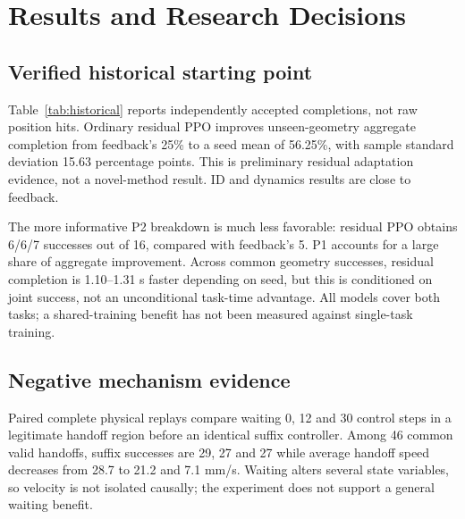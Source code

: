 \section{Results and Research Decisions}
\subsection{Verified historical starting point}
Table~\ref{tab:historical} reports independently accepted completions, not raw position hits. Ordinary residual PPO improves unseen-geometry aggregate completion from feedback's 25\% to a seed mean of 56.25\%, with sample standard deviation 15.63 percentage points. This is preliminary residual adaptation evidence, not a novel-method result. ID and dynamics results are close to feedback.

\begin{table}[t]\centering\small
\caption{Historical v6 independently accepted success generated from audited case records. Each split has 32 matched cases, comprising 16 P1 and 16 P2 cases; triples are seeds 31/41/51, not independent case replications. P1 cannot substitute for P2 evidence. These are not new pilot results.}\label{tab:historical}

\end{table}

The more informative P2 breakdown is much less favorable: residual PPO obtains 6/6/7 successes out of 16, compared with feedback's 5. P1 accounts for a large share of aggregate improvement. Across common geometry successes, residual completion is 1.10--1.31 s faster depending on seed, but this is conditioned on joint success, not an unconditional task-time advantage. All models cover both tasks; a shared-training benefit has not been measured against single-task training.


\subsection{Negative mechanism evidence}
Paired complete physical replays compare waiting 0, 12 and 30 control steps in a legitimate handoff region before an identical suffix controller. Among 46 common valid handoffs, suffix successes are 29, 27 and 27 while average handoff speed decreases from 28.7 to 21.2 and 7.1 mm/s. Waiting alters several state variables, so velocity is not isolated causally; the experiment does not support a general waiting benefit.


